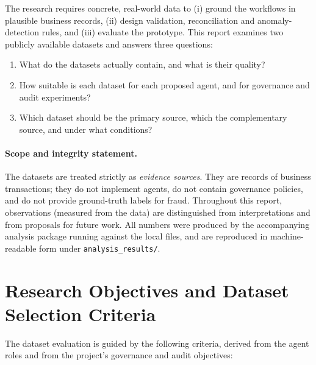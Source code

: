 \documentclass[11pt,a4paper]{article}
\newcommand{\code}[1]{\texttt{#1}}
\begin{document}
The research requires concrete, real-world data to (i) ground the workflows in plausible business records, (ii) design validation, reconciliation and anomaly-detection rules, and (iii) evaluate the prototype. This report examines two publicly available datasets and answers three questions:

\begin{enumerate}[label=(\roman*)]
\item What do the datasets actually contain, and what is their quality?
\item How suitable is each dataset for each proposed agent, and for governance and audit experiments?
\item Which dataset should be the primary source, which the complementary source, and under what conditions?
\end{enumerate}

\paragraph{Scope and integrity statement.}
The datasets are treated strictly as \emph{evidence sources}. They are records of business transactions; they do not implement agents, do not contain governance policies, and do not provide ground-truth labels for fraud. Throughout this report, observations (measured from the data) are distinguished from interpretations and from proposals for future work. All numbers were produced by the accompanying analysis package running against the local files, and are reproduced in machine-readable form under \code{analysis\_results/}.

\section{Research Objectives and Dataset Selection Criteria}
The dataset evaluation is guided by the following criteria, derived from the agent roles and from the project's governance and audit objectives:
\end{document}
